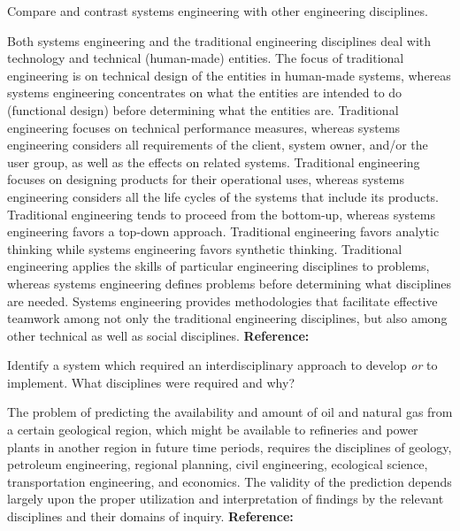 \begin{exercises}
    \begin{exercise} 
    \label{sea-01-30}
        Compare and contrast systems engineering with other engineering disciplines.
    \end{exercise}
    \begin{solution}
        Both systems engineering and the traditional engineering disciplines deal with technology and technical (human-made) entities. The focus of traditional engineering is on technical design of the entities in human-made systems, whereas systems engineering concentrates on what the entities are intended to do (functional design) before determining what the entities are. Traditional engineering focuses on technical performance measures, whereas systems engineering considers all requirements of the client, system owner, and/or the user group, as well as the effects on related systems. Traditional engineering focuses on designing products for their operational uses, whereas systems engineering considers all the life cycles of the systems that include its products. Traditional engineering tends to proceed from the bottom-up, whereas systems engineering favors a top-down approach. Traditional engineering favors analytic thinking while systems engineering favors synthetic thinking. Traditional engineering applies the skills of particular engineering disciplines to problems, whereas systems engineering defines problems before determining what disciplines are needed. Systems engineering provides methodologies that facilitate effective teamwork among not only the traditional engineering disciplines, but also among other technical as well as social disciplines. \textbf{Reference:}
    \end{solution}
    
    \begin{exercise} 
    \label{sea-01-32}
        Identify a system which required an interdisciplinary approach to develop \textit{or} to implement. What disciplines were required and why?
    \end{exercise}
    \begin{solution}
        The problem of predicting the availability and amount of oil and natural gas from a certain geological region, which might be available to refineries and power plants in another region in future time periods, requires the disciplines of geology, petroleum engineering, regional planning, civil engineering, ecological science, transportation engineering, and economics. The validity of the prediction depends largely upon the proper utilization and interpretation of findings by the relevant disciplines and their domains of inquiry. \textbf{Reference:}
    \end{solution}
    

\end{exercises}
